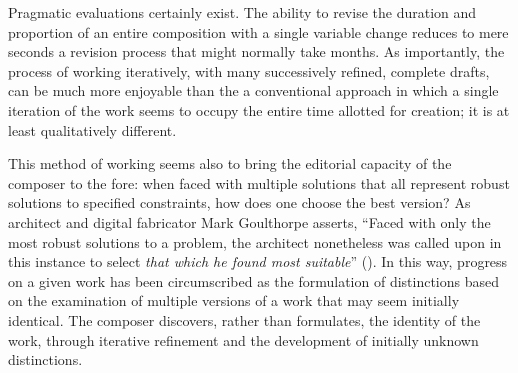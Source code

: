 Pragmatic evaluations certainly exist. The ability to revise the duration and proportion of an entire composition with a single variable change reduces to mere seconds a revision process that might normally take months. As importantly, the process of working iteratively, with many successively refined, complete drafts, can be much more enjoyable than the a conventional approach in which a single iteration of the work seems to occupy the entire time allotted for creation; it is at least qualitatively different. 

This method of working seems also to bring the editorial capacity of the composer to the fore: when faced with multiple solutions that all represent robust solutions to specified constraints, how does one choose the best version? As architect and digital fabricator Mark Goulthorpe asserts, ``Faced with only the most robust solutions to a problem, the architect nonetheless was called upon in this instance to select \emph{that which he found most suitable}'' (\cite[122]{Goulthorpe:2011ly}). In this way, progress on a given work has been circumscribed as the formulation of distinctions based on the examination of multiple versions of a work that may seem initially identical. The composer discovers, rather than formulates, the identity of the work, through iterative refinement and the development of initially unknown distinctions. 